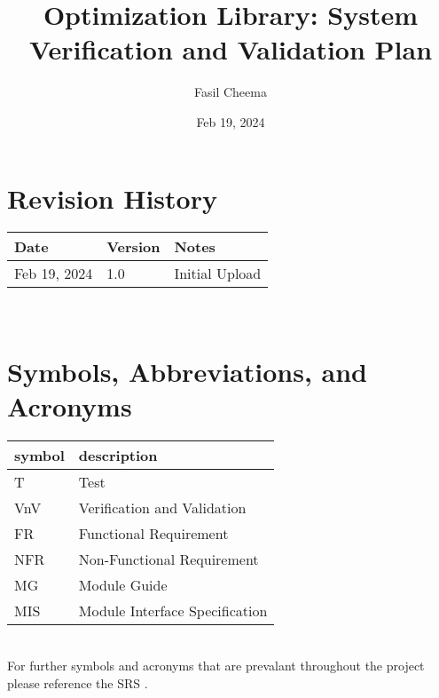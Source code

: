 \documentclass[12pt, titlepage]{article}
\begin{document}
\title{Optimization Library: System Verification and Validation Plan} 

\author{Fasil Cheema}
\date{Feb 19, 2024}
	
\maketitle


\section*{Revision History}

\begin{tabularx}{\textwidth}{p{3cm}p{2cm}X}
\toprule {\bf Date} & {\bf Version} & {\bf Notes}\\
\midrule
Feb 19, 2024 & 1.0 & Initial Upload\\
\bottomrule
\end{tabularx}

~\\


\newpage

\tableofcontents

\newpage

\section{Symbols, Abbreviations, and Acronyms}

\renewcommand{\arraystretch}{1.2}
\begin{tabular}{l l} 
  \toprule		
  \textbf{symbol} & \textbf{description}\\
  \midrule 
  T & Test\\
  VnV & Verification and Validation\\
  FR & Functional Requirement\\
  NFR & Non-Functional Requirement\\
  MG & Module Guide\\
  MIS & Module Interface Specification\\
  \bottomrule
\end{tabular}\\
For further symbols and acronyms that are prevalant
throughout the project please reference the SRS \citep{SRS}.

\newpage

\end{document}
